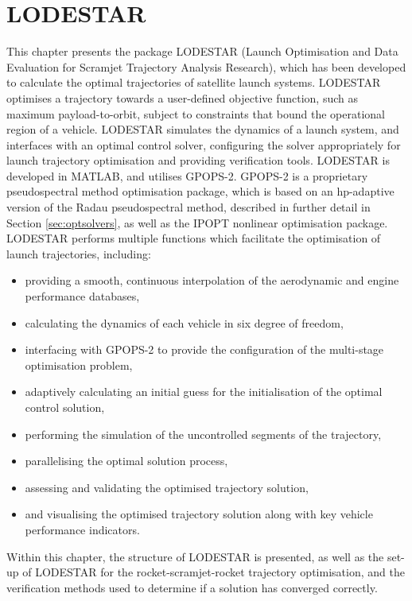 
\cleardoublepage
\chapter{LODESTAR}\label{chapter:LODESTAR}



This chapter presents the package LODESTAR (Launch Optimisation and Data Evaluation for Scramjet Trajectory Analysis Research), which has been developed to calculate the optimal trajectories of satellite launch systems. 
LODESTAR optimises a trajectory towards a user-defined objective function, such as maximum payload-to-orbit, subject to constraints that bound the operational region of a vehicle.
LODESTAR simulates the dynamics of a launch system, and interfaces with an optimal control solver, configuring the solver appropriately for launch trajectory optimisation and providing verification tools. 
LODESTAR is developed in MATLAB, and utilises GPOPS-2\cite{Patterson2015}. GPOPS-2 is a proprietary pseudospectral method optimisation package, which is based on an \textsf{hp}-adaptive version of the Radau pseudospectral method, described in further detail in Section \ref{sec:optsolvers}, as well as the IPOPT nonlinear optimisation package\cite{Wachter2006}.
LODESTAR performs multiple functions which facilitate the optimisation of launch trajectories, including:
\begin{itemize}
	\item providing a smooth, continuous interpolation of the aerodynamic and engine performance databases, 
	
	\item calculating the dynamics of each vehicle in six degree of freedom,
	
	\item interfacing with GPOPS-2 to provide the configuration of the multi-stage optimisation problem,
	
	\item adaptively calculating an initial guess for the initialisation of the optimal control solution,
	
	\item performing the simulation of the uncontrolled segments of the trajectory, 
	
	\item parallelising the optimal solution process,
	
	\item assessing and validating the optimised trajectory solution, 
	
	\item and visualising the optimised trajectory solution along with key vehicle performance indicators.  
	
	
	
\end{itemize}
 Within this chapter, the structure of LODESTAR is presented, as well as the set-up of LODESTAR for the rocket-scramjet-rocket trajectory optimisation, and the verification methods used to determine if a solution has converged correctly.
 
